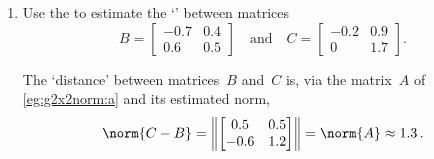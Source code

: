 \begin{example} 
\begin{enumerate}
\item Use the  to estimate the `' between matrices
\begin{equation*}
B=\begin{bmatrix} {-0.7}&{0.4}\\{0.6}&{0.5} \end{bmatrix}
\quad\text{and}\quad
C=\begin{bmatrix} -0.2&0.9\\0&1.7 \end{bmatrix}.
\end{equation*}
\begin{solution} 
The `distance' between matrices~\(B\) and~\(C\) is, via the matrix~\(A\) of \cref{eg:g2x2norm:a} and its estimated norm,
\begin{equation*}
\norm{C-B}=\left\|\begin{bmatrix} 0.5&0.5\\-0.6&1.2 \end{bmatrix}\right\|
=\norm{A}\approx 1.3\,.
\end{equation*} 
\end{solution}



\end{enumerate}
\end{example}
